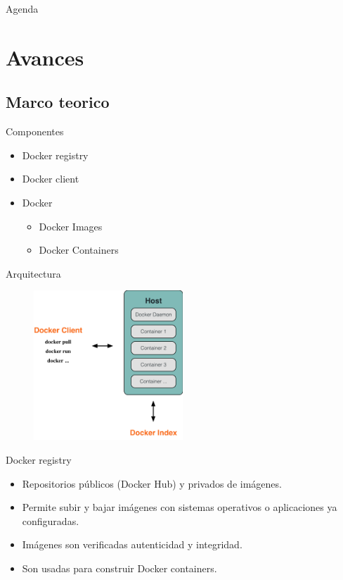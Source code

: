 \documentclass{bredelebeamer}
\begin{document}
\begin{frame}{Agenda}
  \tableofcontents
\end{frame}

\section{Avances}
\subsection{Marco teorico}

\begin{frame}{Componentes}
	
	\begin{itemize}
		\item Docker registry
		\item Docker client
		\item Docker
		\begin{itemize}
			\item Docker Images
			\item Docker Containers
		\end{itemize}

	\end{itemize}
\end{frame}

\begin{frame}{Arquitectura}

  \begin{figure}[H]
  \centering
    \includegraphics[width=0.5\textwidth]{images/architecture.png}
    \label{fig:arquitectura}
\end{figure}	


 \end{frame}

\begin{frame}{Docker registry}
\begin{itemize}
	\item Repositorios públicos (Docker Hub) y privados de imágenes.
	\item Permite subir y bajar imágenes con sistemas operativos o aplicaciones ya configuradas.
	\item Imágenes son verificadas autenticidad y integridad.	
	\item Son usadas para construir Docker containers.
\end{itemize}

\end{frame}
\end{document}
